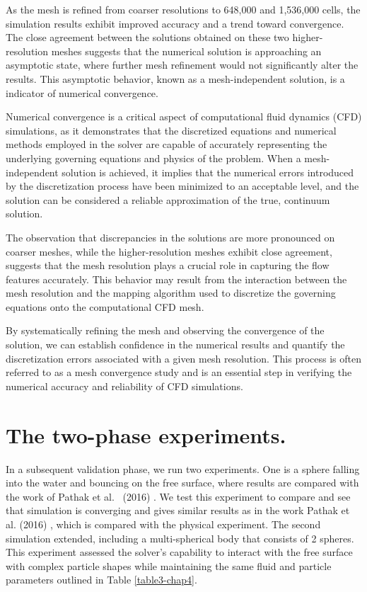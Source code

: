 As the mesh is refined from coarser resolutions to 648,000 and 1,536,000 cells, the simulation results exhibit improved accuracy and a trend toward convergence. The close agreement between the solutions obtained on these two higher-resolution meshes suggests that the numerical solution is approaching an asymptotic state, where further mesh refinement would not significantly alter the results. This asymptotic behavior, known as a mesh-independent solution, is a indicator of numerical convergence.

Numerical convergence is a critical aspect of computational fluid dynamics (CFD) simulations, as it demonstrates that the discretized equations and numerical methods employed in the solver are capable of accurately representing the underlying governing equations and physics of the problem. When a mesh-independent solution is achieved, it implies that the numerical errors introduced by the discretization process have been minimized to an acceptable level, and the solution can be considered a reliable approximation of the true, continuum solution.

The observation that discrepancies in the solutions are more pronounced on coarser meshes, while the higher-resolution meshes exhibit close agreement, suggests that the mesh resolution plays a crucial role in capturing the flow features accurately. This behavior may result from the interaction between the mesh resolution and the mapping algorithm used to discretize the governing equations onto the computational CFD mesh. 

By systematically refining the mesh and observing the convergence of the solution, we can establish confidence in the numerical results and quantify the discretization errors associated with a given mesh resolution. This process is often referred to as a mesh convergence study and is an essential step in verifying the numerical accuracy and reliability of CFD simulations.

\section{The two-phase experiments.}

In a subsequent validation phase, we run two experiments. One is a sphere falling into the water and bouncing on the free surface, where results are compared with the work of Pathak et al.~ (2016) \cite{pathak20163d}. We test this experiment to compare and see that simulation is converging and gives similar results as in the work Pathak et al. (2016) \cite{pathak20163d}, which is compared with the physical experiment.
The second simulation extended, including a multi-spherical body that consists of 2 spheres. This experiment assessed the solver's capability to interact with the free surface with complex particle shapes while maintaining the same fluid and particle parameters outlined in Table \ref{table3-chap4}.

